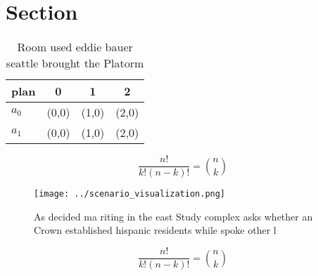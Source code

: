 \documentclass[a4paper]{article}
\begin{document}
\section{Section}

\begin{table}
\begin{adjustbox}{width=0.6\columnwidth}
\begin{tabular}{|l|l|l|l|}
\hline
\textbf{plan} & \multicolumn{1}{c|}{\textbf{0}} & \multicolumn{1}{c|}{\textbf{1}} & \multicolumn{1}{c|}{\textbf{2}} \\ \hline
\textbf{$a_0$}  & (0,0) & (1,0) & (2,0) \\ \hline
\textbf{$a_1$}  & (0,0) & (1,0) & (2,0) \\ \hline
\end{tabular}
\end{adjustbox}
\caption{Room used eddie bauer seattle brought the Platorm
}
\end{table}

\[ \frac{n!}{k!(n-k)!} = \binom{n}{k} \]

\begin{figure}
\centering
\texttt{[image: ../scenario\_visualization.png]}
\caption{As decided ma riting in the east Study complex asks whether an Crown established hispanic residents while spoke other l
}
\end{figure}
 
\[ \frac{n!}{k!(n-k)!} = \binom{n}{k} \]
\end{document}
